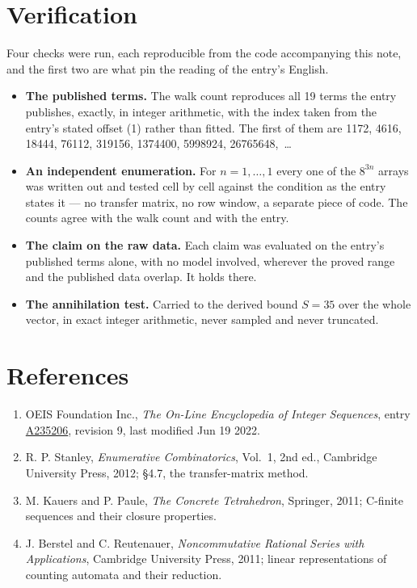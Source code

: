 \documentclass[11pt]{article}
\theoremstyle{definition}
\begin{document}
\section{Verification}

Four checks were run, each reproducible from the code accompanying this note, and the first two are what pin the reading of the entry's English.

\begin{itemize}

\item {\bfseries The published terms.} The walk count reproduces all 19 terms the entry publishes, exactly, in integer arithmetic, with the index taken from the entry's stated offset (1) rather than fitted. The first of them are 1172, 4616, 18444, 76112, 319156, 1374400, 5998924, 26765648,~\dots

\item {\bfseries An independent enumeration.} For $n = 1,\dots,1$ every one of the $8^{3n}$ arrays was written out and tested cell by cell against the condition as the entry states it --- no transfer matrix, no row window, a separate piece of code. The counts agree with the walk count and with the entry.

\item {\bfseries The claim on the raw data.} Each claim was evaluated on the entry's published terms alone, with no model involved, wherever the proved range and the published data overlap. It holds there.

\item {\bfseries The annihilation test.} Carried to the derived bound $S = 35$ over the whole vector, in exact integer arithmetic, never sampled and never truncated.

\end{itemize}

\section{References}

\begin{enumerate}

\item OEIS Foundation Inc., \emph{The On-Line Encyclopedia of Integer Sequences}, entry \href{https://oeis.org/A235206}{A235206}, revision 9, last modified Jun 19 2022.

\item R. P. Stanley, \emph{Enumerative Combinatorics}, Vol.~1, 2nd ed., Cambridge University Press, 2012; \S4.7, the transfer-matrix method.

\item M. Kauers and P. Paule, \emph{The Concrete Tetrahedron}, Springer, 2011; C-finite sequences and their closure properties.

\item J. Berstel and C. Reutenauer, \emph{Noncommutative Rational Series with Applications}, Cambridge University Press, 2011; linear representations of counting automata and their reduction.

\end{enumerate}
\end{document}
